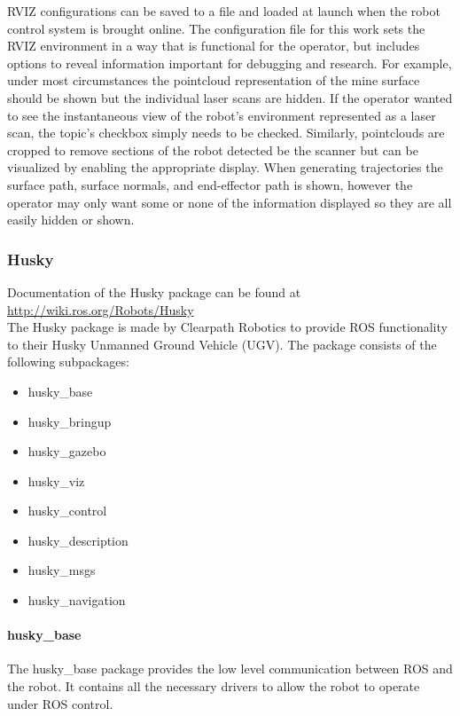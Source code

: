 RVIZ configurations can be saved to a file and loaded at launch when the robot control system is brought online. The configuration file for this work sets the RVIZ environment in a way that is functional for the operator, but includes options to reveal information important for debugging and research. For example, under most circumstances the pointcloud representation of the mine surface should be shown but the individual laser scans are hidden. If the operator wanted to see the instantaneous view of the robot's environment represented as a laser scan, the topic's checkbox simply needs to be checked. Similarly, pointclouds are cropped to remove sections of the robot detected be the scanner but can be visualized by enabling the appropriate display. When generating trajectories the surface path, surface normals, and end-effector path is shown, however the operator may only want some or none of the information displayed so they are all easily hidden or shown.\\

\subsubsection{Husky}

Documentation of the Husky package can be found at \url{http://wiki.ros.org/Robots/Husky}\\

The Husky package is made by Clearpath Robotics to provide ROS functionality to their Husky Unmanned Ground Vehicle (UGV). The package consists of the following subpackages:

\begin{itemize}
    \item husky\_base
    \item husky\_bringup
    \item husky\_gazebo
    \item husky\_viz
    \item husky\_control
    \item husky\_description
    \item husky\_msgs
    \item husky\_navigation
\end{itemize}

\paragraph{husky\_base}

The husky\_base package provides the low level communication between ROS and the robot. It contains all the necessary drivers to allow the robot to operate under ROS control.\\

